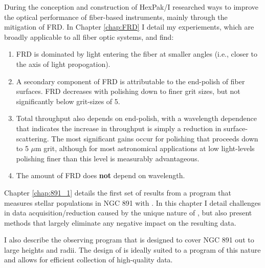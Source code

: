 During the conception and construction of HexPak/\GP I researched ways
to improve the optical performance of fiber-based instruments, mainly
through the mitigation of FRD. In Chapter \ref{chap:FRD} I detail my
experiements, which are broadly applicable to all fiber optic systems,
and find:
\begin{enumerate}

\item FRD is dominated by light entering the fiber at smaller angles
  (i.e., closer to the axis of light propogation).

\item A secondary component of FRD is attributable to the end-polish
  of fiber surfaces. FRD decreases with polishing down to finer grit
  sizes, but not significantly below grit-sizes of 5\mum.

\item Total throughput also depends on end-polish, with a wavelength
  dependence that indicates the increase in throughput is simply a
  reduction in surface-scattering.  The most significant gains occur
  for polishing that proceeds down to 5 $\mu$m grit, although for most
  astronomical applications at low light-levels polishing finer than
  this level is measurably advantageous.

\item The amount of FRD does \textbf{not} depend on wavelength.

\end{enumerate}

Chapter \ref{chap:891_1} details the first set of results from a
program that measures stellar populations in NGC 891 with \GP. In this
chapter I detail challenges in data acquisition/reduction caused by
the unique nature of \GP, but also present methods that largely
eliminate any negative impact on the resulting data.

I also describe the observing program that is designed to cover NGC
891 out to large heights and radii. The design of \GP is ideally
suited to a program of this nature and allows for efficient collection
of high-quality data.

